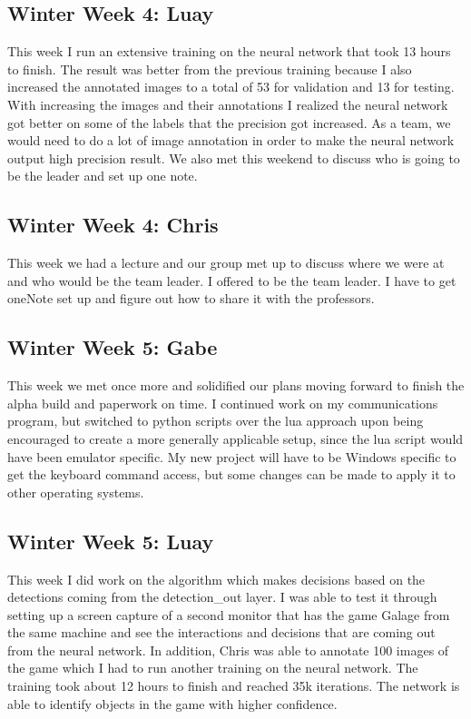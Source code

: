 \documentclass[onecolumn, draftclsnofoot,10pt, compsoc]{IEEEtran}
\begin{document}
\subsection{Winter Week 4: Luay}
This week I run an extensive training on the neural network that took 13 hours to finish. The result was better from the previous training because I also increased the annotated images to a total of 53 for validation and 13 for testing. With increasing the images and their annotations I realized the neural network got better on some of the labels that the precision got increased. As a team, we would need to do a lot of image annotation in order to make the neural network output high precision result. We also met this weekend to discuss who is going to be the leader and set up one note.
\subsection{Winter Week 4: Chris}
This week we had a lecture and our group met up to discuss where we were at and who would be the team leader. I offered to be the team leader. I have to get oneNote set up and figure out how to share it with the professors.
\subsection{Winter Week 5: Gabe}
This week we met once more and solidified our plans moving forward to finish the alpha build and paperwork on time. I continued work on my communications program, but switched to python scripts over the lua approach upon being encouraged to create a more generally applicable setup, since the lua script would have been emulator specific. My new project will have to be Windows specific to get the keyboard command access, but some changes can be made to apply it to other operating systems.
\subsection{Winter Week 5: Luay}
This week I did work on the algorithm which makes decisions based on the detections coming from the detection_out layer. I was able to test it through setting up a screen capture of a second monitor that has the game Galage from the same machine and see the interactions and decisions that are coming out from the neural network. In addition, Chris was able to annotate 100 images of the game which I had to run another training on the neural network. The training took about 12 hours to finish and reached 35k iterations. The network is able to identify objects in the game with higher confidence.
\end{document}
